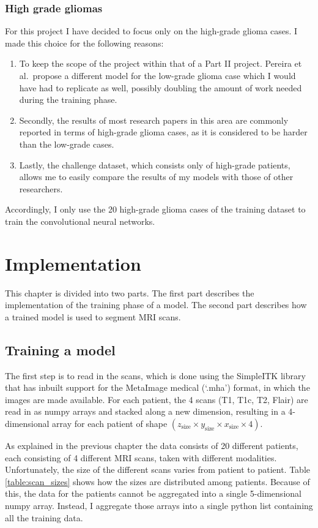 \documentclass[12pt,a4paper,twoside,openright]{report}
\begin{document}
\subsection{High grade gliomas}
For this project I have decided to focus only on the high-grade glioma cases. I made this choice for the following reasons:
\begin{enumerate}
	\item To keep the scope of the project within that of a Part II project. Pereira et al.\ propose a different model for the low-grade glioma case which I would have had to replicate as well, possibly doubling the amount of work needed during the training phase.
	\item Secondly, the results of most research papers in this area are commonly reported in terms of high-grade glioma cases, as it is considered to be harder than the low-grade cases. 
	\item Lastly, the challenge dataset, which consists only of high-grade patients, allows me to easily compare the results of my models with those of other researchers. 
\end{enumerate}
Accordingly, I only use the 20 high-grade glioma cases of the training dataset to train the convolutional neural networks.

\chapter{Implementation}
This chapter is divided into two parts. The first part describes the implementation of the training phase of a model. The second part describes how a trained model is used to segment MRI scans.

\section{Training a model}
The first step is to read in the scans, which is done using the SimpleITK library that has inbuilt support for the MetaImage medical (`.mha') format, in which the images are made available. For each patient, the 4 scans (T1, T1c, T2, Flair) are read in as numpy arrays and stacked along a new dimension, resulting in a 4-dimensional array for each patient of shape $(z_{\text{size}} \times y_{\text{size}} \times x_{\text{size}} \times 4)$.
 
As explained in the previous chapter the data consists of 20 different patients, each consisting of 4 different MRI scans, taken with different modalities. Unfortunately, the size of the different scans varies from patient to patient. Table \ref{table:scan_sizes} shows how the sizes are distributed among patients. Because of this, the data for the patients cannot be aggregated into a single 5-dimensional numpy array. Instead, I aggregate those arrays into a single python list containing all the training data.
\end{document}
